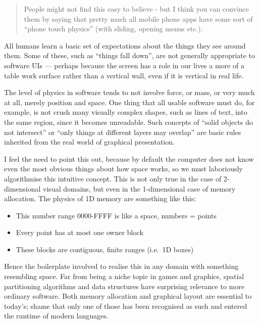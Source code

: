 \documentclass[english,submission]{programming}
\providecommand{\tightlist}{%
  \setlength{\itemsep}{0pt}\setlength{\parskip}{0pt}}
\begin{document}
  \begin{quote}
  People might not find this easy to believe - but I think you can
  convince them by saying that pretty much all mobile phone apps have some
  sort of ``phone touch physics'' (with sliding, opening menus etc.).
  \end{quote}

  All humans learn a basic set of expectations about the things they see
  around them. Some of these, such as ``things fall down'', are not
  generally appropriate to software UIs --- perhaps because the screen has
  a role in our lives a more of a table work surface rather than a
  vertical wall, even if it is vertical in real life.

  The level of physics in software tends to not involve force, or mass, or
  very much at all, merely position and space. One thing that all usable
  software must do, for example, is not crush many visually complex
  shapes, such as lines of text, into the same region, since it becomes
  unreadable. Such concepts of ``solid objects do not intersect'' or
  ``only things at different layers may overlap'' are basic rules
  inherited from the real world of graphical presentation.

  I feel the need to point this out, because by default the computer does
  not know even the most obvious things about how space works, so we must
  laboriously algorithmise this intuitive concept. This is not only true
  in the case of 2-dimensional visual domains, but even in the
  1-dimensional case of memory allocation. The physics of 1D memory are
  something like this:

  \begin{itemize}
  \tightlist
  \item
    This number range 0000-FFFF is like a space, numbers = points
  \item
    Every point has at most one owner block
  \item
    These blocks are contiguous, finite ranges (i.e.~1D boxes)
  \end{itemize}

  Hence the boilerplate involved to realise this in any domain with
  something resembling space. Far from being a niche topic in games and
  graphics, spatial partitioning algorithms and data structures have
  surprising relevance to more ordinary software. Both memory allocation
  and graphical layout are essential to today's; shame that only one of
  those has been recognised as such and entered the runtime of modern
  languages.
\end{document}
